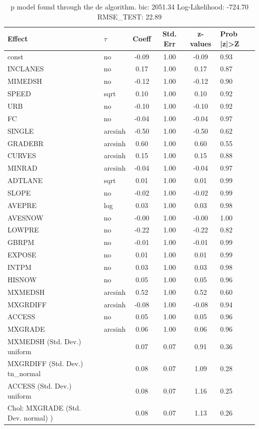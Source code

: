 \begin{table}
	\caption{p model found through the de algorithm. bic: 2051.34 Log-Likelihood: -724.70 RMSE_TEST: 22.89}
	\begin{center}
		\begin{tabular}{|l|l|c|c|c|l|}
			\hline
			Effect & $\tau$ & Coeff & Std. Err & z-values & Prob |z|>Z \\
			\hline
			const & no & -0.09 & 1.00 & -0.09 & 0.93 \\
			\hline
			INCLANES & no & 0.17 & 1.00 & 0.17 & 0.87 \\
			\hline
			MIMEDSH & no & -0.12 & 1.00 & -0.12 & 0.90 \\
			\hline
			SPEED & sqrt & 0.10 & 1.00 & 0.10 & 0.92 \\
			\hline
			URB & no & -0.10 & 1.00 & -0.10 & 0.92 \\
			\hline
			FC & no & -0.04 & 1.00 & -0.04 & 0.97 \\
			\hline
			SINGLE & arcsinh & -0.50 & 1.00 & -0.50 & 0.62 \\
			\hline
			GRADEBR & arcsinh & 0.60 & 1.00 & 0.60 & 0.55 \\
			\hline
			CURVES & arcsinh & 0.15 & 1.00 & 0.15 & 0.88 \\
			\hline
			MINRAD & arcsinh & -0.04 & 1.00 & -0.04 & 0.97 \\
			\hline
			ADTLANE & sqrt & 0.01 & 1.00 & 0.01 & 0.99 \\
			\hline
			SLOPE & no & -0.02 & 1.00 & -0.02 & 0.99 \\
			\hline
			AVEPRE & log & 0.03 & 1.00 & 0.03 & 0.98 \\
			\hline
			AVESNOW & no & -0.00 & 1.00 & -0.00 & 1.00 \\
			\hline
			LOWPRE & no & -0.22 & 1.00 & -0.22 & 0.82 \\
			\hline
			GBRPM & no & -0.01 & 1.00 & -0.01 & 0.99 \\
			\hline
			EXPOSE & no & 0.01 & 1.00 & 0.01 & 0.99 \\
			\hline
			INTPM & no & 0.03 & 1.00 & 0.03 & 0.98 \\
			\hline
			HISNOW & no & 0.05 & 1.00 & 0.05 & 0.96 \\
			\hline
			MXMEDSH & arcsinh & 0.52 & 1.00 & 0.52 & 0.60 \\
			\hline
			MXGRDIFF & arcsinh & -0.08 & 1.00 & -0.08 & 0.94 \\
			\hline
			ACCESS & no & 0.05 & 1.00 & 0.05 & 0.96 \\
			\hline
			MXGRADE & arcsinh & 0.06 & 1.00 & 0.06 & 0.96 \\
			\hline
			MXMEDSH (Std. Dev.) uniform &  & 0.07 & 0.07 & 0.91 & 0.36 \\
			\hline
			MXGRDIFF (Std. Dev.) tn_normal &  & 0.08 & 0.07 & 1.09 & 0.28 \\
			\hline
			ACCESS (Std. Dev.) uniform &  & 0.08 & 0.07 & 1.16 & 0.25 \\
			\hline
			 Chol: MXGRADE (Std. Dev. normal) ) &  & 0.08 & 0.07 & 1.13 & 0.26 \\
			\hline
		\end{tabular}
	\end{center}
\end{table}